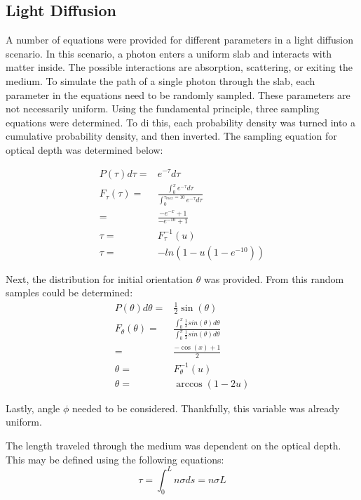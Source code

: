 \documentclass[twocolumn]{article}
\begin{document}
\subsection{Light Diffusion}
A number of equations were provided for different parameters in a light diffusion scenario. In this scenario, a photon enters a uniform slab and interacts with matter inside. The possible interactions are absorption, scattering, or exiting the medium. To simulate the path of a single photon through the slab, each parameter in the equations need to be randomly sampled. These parameters are not necessarily uniform. Using the fundamental principle, three sampling equations were determined. To di this, each probability density was turned into a cumulative probability density, and then inverted. The sampling equation for optical depth was determined below:

\begin{equation}
\label{eq:tau_sample}
\begin{split}
P(\tau) d\tau =& e^{-\tau} d\tau \\
F_{\tau} (\tau) =& \frac{\int_{0}^{x} e^{-\tau} d\tau}{\int_{0}^{\tau_{max} = 10} e^{-\tau} d\tau}\\
				=& \frac{-e^{-x} + 1}{-e^{-10} + 1}\\
\tau =& F^{-1}_{\tau}(u) \\
\tau =& -ln(1-u(1-e^{-10}))
\end{split}
\end{equation}

Next, the distribution for initial orientation $\theta$ was provided. From this random samples could be determined:
\begin{equation}
\label{eq:theta_sample}
\begin{split}
P(\theta) d\theta =& \frac{1}{2} \sin(\theta) \\
F_{\theta} (\theta) =& \frac{\int_{0}^{x} \frac{1}{2} sin(\theta) d\theta}{\int_{0}^{\pi} \frac{1}{2} sin(\theta) d\theta}\\
					=& \frac{-\cos(x) + 1}{2}\\
\theta =& F^{-1}_{\theta}(u) \\
\theta =& \arccos(1-2u)
\end{split}
\end{equation}

Lastly, angle $\phi$ needed to be considered. Thankfully, this variable was already uniform.

The length traveled through the medium was dependent on the optical depth. This may be defined using the following equations:
\begin{equation}
\tau = \int^L_0 n \sigma ds = n \sigma L
\end{equation}
\end{document}
